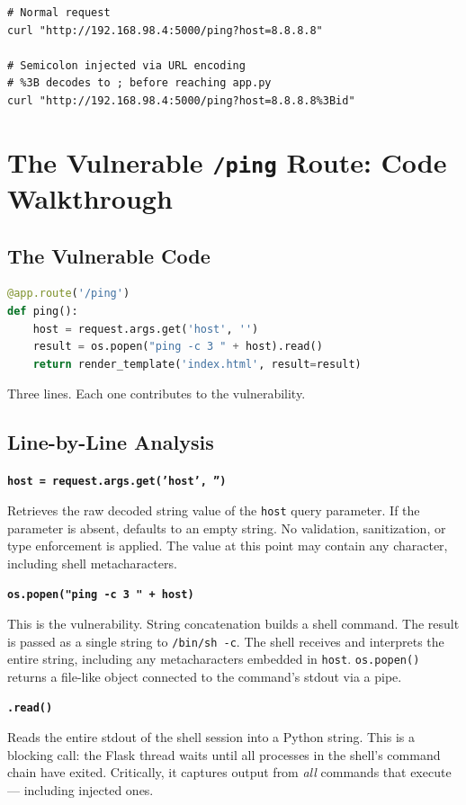 \begin{lstlisting}
# Normal request
curl "http://192.168.98.4:5000/ping?host=8.8.8.8"

# Semicolon injected via URL encoding
# %3B decodes to ; before reaching app.py
curl "http://192.168.98.4:5000/ping?host=8.8.8.8%3Bid"
\end{lstlisting}

\section{The Vulnerable \texttt{/ping} Route: Code Walkthrough}

\subsection{The Vulnerable Code}

\begin{lstlisting}[language=Python]
@app.route('/ping')
def ping():
    host = request.args.get('host', '')
    result = os.popen("ping -c 3 " + host).read()
    return render_template('index.html', result=result)
\end{lstlisting}

Three lines. Each one contributes to the vulnerability.

\subsection{Line-by-Line Analysis}

\textbf{\texttt{host = request.args.get('host', '')}}

Retrieves the raw decoded string value of the \texttt{host} query parameter. If the parameter is absent, defaults to an empty string. No validation, sanitization, or type enforcement is applied. The value at this point may contain any character, including shell metacharacters.

\textbf{\texttt{os.popen("ping -c 3 " + host)}}

This is the vulnerability. String concatenation builds a shell command. The result is passed as a single string to \texttt{/bin/sh -c}. The shell receives and interprets the entire string, including any metacharacters embedded in \texttt{host}. \texttt{os.popen()} returns a file-like object connected to the command's stdout via a pipe.

\textbf{\texttt{.read()}}

Reads the entire stdout of the shell session into a Python string. This is a blocking call: the Flask thread waits until all processes in the shell's command chain have exited. Critically, it captures output from \emph{all} commands that execute --- including injected ones.

